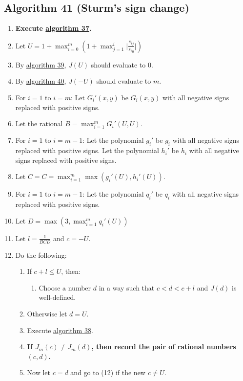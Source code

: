\documentclass[twocolumn]{article}
\begin{document}
		\subsection{Algorithm 41 (Sturm's sign change)}\label{sec:algorithm 41}
			\begin{enumerate}
				\item \textbf{Execute \hyperref[sec:algorithm 37]{algorithm 37}.}
				\item Let $U=1+\max_{i=0}^m\left(1+\max_{j=1}^i\lvert\frac{{s_i}_j}{{s_i}_0}\rvert\right)$
				\item By \hyperref[sec:algorithm 39]{algorithm 39}, $J(U)$ should evaluate to $0$.
				\item By \hyperref[sec:algorithm 40]{algorithm 40}, $J(-U)$ should evaluate to $m$.
				\item For $i=1$ to $i=m$: Let $G_i'(x,y)$ be $G_i(x,y)$ with all negative signs replaced with positive signs.
				\item Let the rational $B=\max_{i=1}^m G_i'(U,U)$.
				\item For $i=1$ to $i=m-1$: Let the polynomial $g_i'$ be $g_i$ with all negative signs replaced with positive signs. Let the polynomial $h_i'$ be $h_i$ with all negative signs replaced with positive signs.
				\item Let $C=C=\max_{i=1}^m \max(g_i'(U),h_i'(U))$.
				\item For $i=1$ to $i=m-1$: Let the polynomial $q_i'$ be $q_i$ with all negative signs replaced with positive signs.
				\item Let $D=\max(3, \max_{i=1}^m q_i'(U))$
				\item Let $l=\frac{1}{BCD}$ and $c=-U$.
				\item Do the following:
				\begin{enumerate}
					\item If $c+l\le U$, then:
					\begin{enumerate}
						\item Choose a number $d$ in a way such that $c<d<c+l$ and $J(d)$ is well-defined.
					\end{enumerate}
					\item Otherwise let $d=U$.
					\item Execute \hyperref[sec:algorithm 38]{algorithm 38}.
					\item \textbf{If $J_m(c)\ne J_m(d)$, then record the pair of rational numbers $(c,d)$.}
					\item Now let $c=d$ and go to (12) if the new $c\ne U$.
				\end{enumerate}

\end{enumerate}
\end{document}
